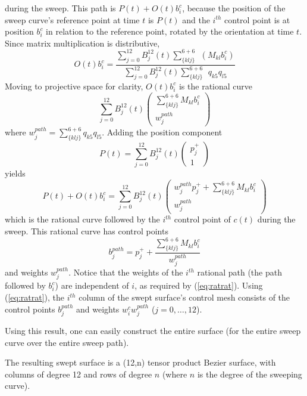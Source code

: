 during the sweep.
This path is $P(t) + O(t)b_i^{c}$, because the position of the sweep
curve's reference point at time $t$ is $P(t)$ and the $i^{th}$ control
point is at position $b_i^c$ in relation to the reference point, rotated
by the orientation at time $t$.
Since matrix multiplication is distributive,
\[
	O(t)b_i^{c} = 
\frac{\sum_{j=0}^{12} B_j^{12}(t) \sum_{\{klj\}}^{6+6}
	\ \ (M_{kl} b_i^{c}) }
     {\sum_{j=0}^{12} B_j^{12}(t) \sum_{\{klj\}}^{6+6} 
	\ \ q_{k5}q_{l5}}
\]
Moving to projective space for clarity, 
$O(t)b_i^{c}$ is the rational curve
\[
	\sum_{j=0}^{12} B_j^{12}(t) 
	\left(	\begin{array}{c}
	\sum_{\{klj\}}^{6+6} M_{kl} b_i^{c} \\ w_j^{path}
	\end{array} \right)
\]
where $w_j^{path} = \sum_{\{klj\}}^{6+6} q_{k5} q_{l5}$.
Adding the position component 
\[
P(t) = 	\sum_{j=0}^{12} B_j^{12}(t) 
	\left(	\begin{array}{c}
	p_j^{+} \\ 1
	\end{array} \right)
\]
yields
\[
P(t) + O(t)b_i^{c} = 
	\sum_{j=0}^{12} B_j^{12}(t) 
	\left(	\begin{array}{c}
	w_j^{path} p_j^{+} + \sum_{\{klj\}}^{6+6} M_{kl} b_i^{c} \\ 
	w_j^{path}
	\end{array} \right)
\]
which is the rational curve followed by the $i^{th}$ control point
of $c(t)$ during the sweep.
This rational curve has control points 
\begin{equation}
\label{eq:tpcontrol}
b_{j}^{path} = p_j^{+} + \frac{\sum_{\{klj\}}^{6+6} M_{kl} b_i^{c}}{w_j^{path}}
\end{equation}
and weights $w_j^{path}$.
Notice that the weights of the $i^{th}$ rational path 
(the path followed by $b_i^c$) are 
independent of $i$, as required by (\ref{eq:ratrat}).
Using (\ref{eq:ratrat}), 
the $i^{th}$ column of the swept surface's control mesh consists
of the control points $b_{j}^{path}$
and weights $w_i^{c} w_j^{path}$ ($j=0,\ldots,12$).
\QED

Using this result, one can easily construct the entire surface
(for the entire sweep curve over the entire sweep path).

\begin{corollary}
The resulting swept surface is a (12,n) tensor product Bezier surface,
with columns of degree 12 and rows of degree $n$
(where $n$ is the degree of the sweeping curve).
\end{corollary}

